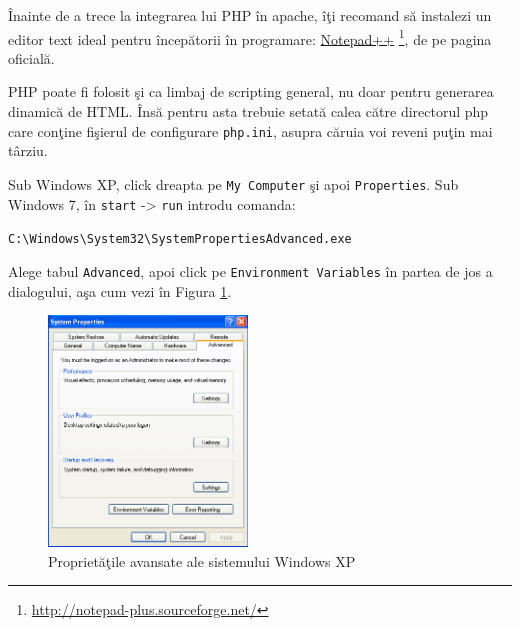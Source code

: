 Înainte de a trece la integrarea lui PHP în apache, îţi recomand să
instalezi un editor text ideal pentru începătorii în programare:
\href{http://notepad-plus.sourceforge.net/}{Notepad++}
\footnote{\url{http://notepad-plus.sourceforge.net/}}, de pe pagina oficială.
%



PHP poate fi folosit şi ca limbaj de scripting general, nu doar pentru
generarea dinamică de HTML. Însă pentru asta trebuie setată calea
către directorul php care conţine fişierul de configurare \texttt{php.ini},
asupra căruia voi reveni puţin mai târziu.

Sub Windows XP, click dreapta pe \texttt{My Computer} şi apoi \texttt{Properties}.
Sub Windows 7, în \texttt{start} -> \texttt{run} introdu comanda:

\texttt{C:{\textbackslash}Windows{\textbackslash}System32{\textbackslash}SystemPropertiesAdvanced.exe}

Alege tabul \texttt{Advanced}, apoi click pe \texttt{Environment Variables} în partea de jos
a dialogului, aşa cum vezi în Figura \ref{fig:win adv props}.
\begin{figure}[h!]
  \centering
    \includegraphics[width=200px]{cap01/Screenshot-12.png}
  \caption{Proprietăţile avansate ale sistemului Windows XP}
  \label{fig:win adv props}
\end{figure}


